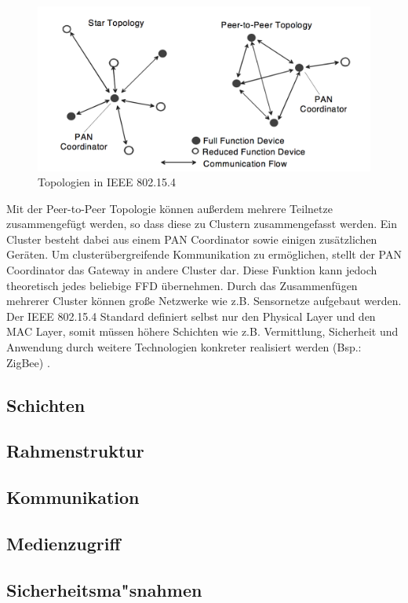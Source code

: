 \begin{figure}[H] 
	\centering
	\includegraphics[scale=0.5]{Bilder/topologies}
	\caption{Topologien in IEEE 802.15.4\cite{d:ieee}}
	\label{f:topologies}
\end{figure}

Mit der Peer-to-Peer Topologie können außerdem mehrere Teilnetze zusammengefügt werden, so dass diese zu Clustern zusammengefasst werden. Ein Cluster besteht dabei aus einem PAN Coordinator sowie einigen zusätzlichen Geräten. Um clusterübergreifende Kommunikation zu ermöglichen, stellt der PAN Coordinator das Gateway in andere Cluster dar. Diese Funktion kann jedoch theoretisch jedes beliebige FFD übernehmen. Durch das Zusammenfügen mehrerer Cluster können große Netzwerke wie z.B. Sensornetze aufgebaut werden. \\
Der IEEE 802.15.4 Standard definiert selbst nur den Physical Layer und den MAC Layer, somit müssen höhere Schichten wie z.B. Vermittlung, Sicherheit und Anwendung durch weitere Technologien konkreter realisiert werden (Bsp.: ZigBee) \cite{d:hesse} \cite{d:ieee}.

\subsection{Schichten}\label{ss:Schichten}

\subsection{Rahmenstruktur}\label{ss:Rahmenstruktur}

\subsection{Kommunikation}\label{ss:Kommunikation}

\subsection{Medienzugriff}\label{ss:Medienzugriff}

\subsection{Sicherheitsma"snahmen}\label{ss:Sicherheitsmassnahmen}